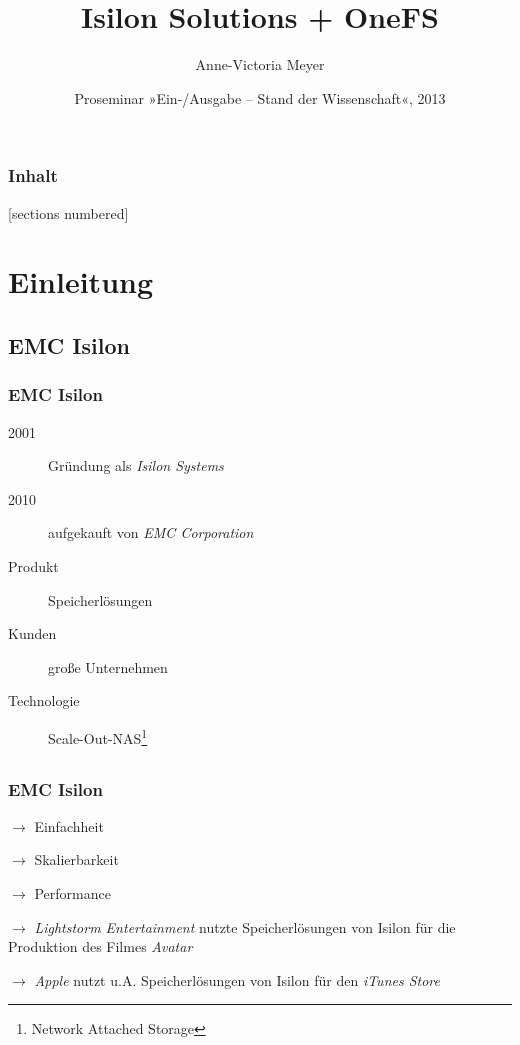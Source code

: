 \documentclass{beamer}
\title{Isilon Solutions + OneFS}
\author{Anne-Victoria Meyer}
\institute{Universität Hamburg}
\date{Proseminar »Ein-/Ausgabe – Stand der Wissenschaft«, 2013}
\begin{document}
\frame{\titlepage}

\begin{frame}
  \frametitle{Inhalt}
  \setcounter{tocdepth}{1}
  [sections numbered]
  \tableofcontents
\end{frame}


\section{Einleitung}

\subsection{EMC Isilon}
\begin{frame}[fragile]
  \frametitle{EMC Isilon}
  \begin{description}
    \item[2001] Gründung als \emph{Isilon Systems}
    \item[2010] aufgekauft von \emph{EMC Corporation}
    \item[] 
    \item[Produkt]Speicherlösungen
    \item[Kunden]große Unternehmen
    \item[Technologie]Scale-Out-NAS\footnote{Network Attached Storage}          
  \end{description}

\end{frame}

\subsection{}
\begin{frame}[fragile]
  \frametitle{EMC Isilon}
\begin{description}         
    \item[Leitwerte] $\rightarrow$ Einfachheit
    \item $\rightarrow$ Skalierbarkeit
    \item $\rightarrow$ Performance
    \item[]
    \item[Beispiele] $\rightarrow$ \emph{Lightstorm Entertainment} nutzte Speicherlösungen von Isilon für die Produktion des Filmes \emph{Avatar}
    \item $\rightarrow$ \emph{Apple} nutzt u.A. Speicherlösungen von Isilon für den \emph{iTunes Store}
  \end{description}

\end{frame}
\end{document}
